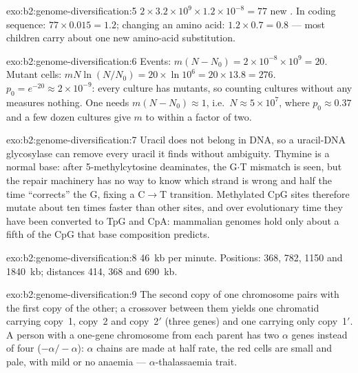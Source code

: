 \begin{solution}{exo:b2:genome-diversification:5}
$2\times 3.2\times 10^{9}\times 1.2\times 10^{-8} = 77$ new .
In coding sequence: $77\times 0.015 = 1.2$; changing an amino acid:
$1.2\times 0.7 = 0.8$ --- most children carry about one new
amino-acid substitution.
\end{solution}

\begin{solution}{exo:b2:genome-diversification:6}
Events: $m(N - N_0) = 2\times 10^{-8}\times 10^{9} = 20$. Mutant
cells: $mN\ln(N/N_0) = 20\times \ln 10^{6} = 20\times 13.8 = 276$.
$p_0 = e^{-20} \approx 2\times 10^{-9}$: every culture has mutants, so
counting cultures without any measures nothing. One needs $m(N -
N_0) \approx 1$, i.e.\ $N \approx 5\times 10^{7}$, where $p_0 \approx
0.37$ and a few dozen cultures give $m$ to within a factor of two.
\end{solution}

\begin{solution}{exo:b2:genome-diversification:7}
Uracil does not belong in DNA, so a uracil-DNA glycosylase can
remove every uracil it finds without ambiguity. Thymine is a normal
base: after 5-methylcytosine deaminates, the G$\cdot$T mismatch is
seen, but the repair machinery has no way to know which strand is
wrong and half the time ``corrects'' the G, fixing a C$\to$T
transition. Methylated CpG sites therefore mutate about ten times
faster than other sites, and over evolutionary time they have been
converted to TpG and CpA: mammalian genomes hold only about a fifth
of the CpG that base composition predicts.
\end{solution}

\begin{solution}{exo:b2:genome-diversification:8}
\qty{46}{kb} per minute. Positions: 368, 782, 1150 and
\qty{1840}{kb}; distances 414, 368 and \qty{690}{kb}.
\end{solution}

\begin{solution}{exo:b2:genome-diversification:9}
The second copy of one chromosome pairs with the first copy of the
other; a crossover between them yields one chromatid carrying
copy~1, copy~2 and copy~2$'$ (three genes) and one carrying only
copy~1$'$. A person with a one-gene chromosome from each parent has
two $\alpha$ genes instead of four ($-\alpha/-\alpha$): $\alpha$
chains are made at half rate, the red cells are small and
pale, with mild or no anaemia --- $\alpha$-thalassaemia trait.
\end{solution}

